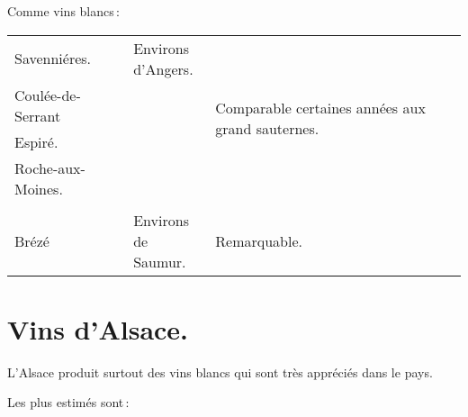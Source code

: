 Comme vins blancs :

\scriptsize
\begin{longtable}{m{10em}m{12em}m{12em}}                                                    
  Savenniéres.             & \makecell{Environs             
                             \\ d'Angers.}                  & \multirow{4}{12em}{Comparable certaines années aux 
                                                              grand sauternes.}                                        \\
  Coulée-de-Serrant        & \makecell{—}                   &                                                          \\
  Espiré.                  & \makecell{—}                   &                                                          \\
  Roche-aux-Moines.        & \makecell{—}                   &                                                          \\
                           &                                &                                                          \\
  Brézé                    & \makecell{Environs            
                             \\ de Saumur.}                 & Remarquable.                                             \\
\end{longtable}
\normalsize

\section*{\centering Vins d'Alsace.}

L'Alsace produit surtout des vins blancs qui sont très appréciés dans le pays.

\medskip

Les plus estimés sont :

